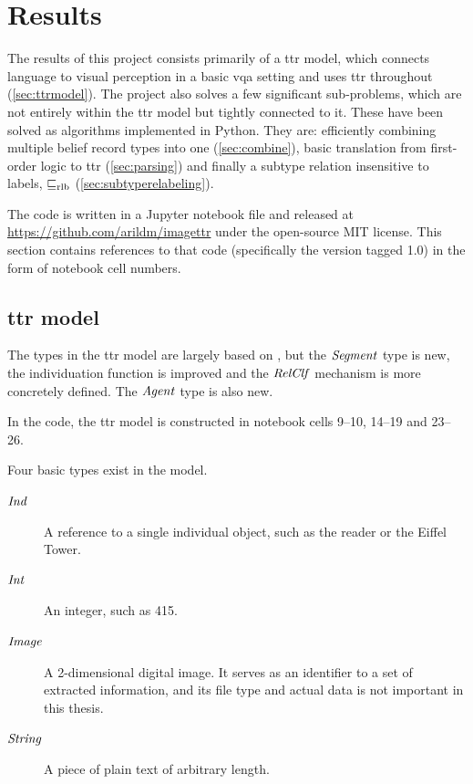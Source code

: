 \renewcommand{\sectionautorefname}{Section}
\let\subsectionautorefname\sectionautorefname
\let\subsubsectionautorefname\sectionautorefname
\section{Results}
\label{sec:results}

The results of this project consists primarily of a \gls{ttr} model, which connects language to visual perception in a basic \gls{vqa} setting and uses \gls{ttr} throughout (\autoref{sec:ttrmodel}).
The project also solves a few significant sub-problems, which are not entirely within the \gls{ttr} model but tightly connected to it.
These have been solved as algorithms implemented in Python.
They are: efficiently combining multiple belief record types into one (\autoref{sec:combine}), basic translation from first-order logic to \gls{ttr} (\autoref{sec:parsing}) and finally a subtype relation insensitive to labels, $\mathrel{\sqsubseteq_\text{rlb}}$ (\autoref{sec:subtyperelabeling}).

The code is written in a Jupyter notebook file and released at \url{https://github.com/arildm/imagettr} under the open-source MIT license.
This section contains references to that code (specifically the version tagged 1.0) in the form of notebook cell numbers.



\subsection{\Gls{ttr} model}
\label{sec:ttrmodel}

The types in the \gls{ttr} model are largely based on \cite{lspc}, but the $\mathit{Segment}$ type is new, the individuation function is improved and the $\mathit{RelClf}$ mechanism is more concretely defined.
The $\mathit{Agent}$ type is also new.

In the code, the \gls{ttr} model is constructed in notebook cells 9–10, 14–19 and 23–26.

Four basic types exist in the model.

\begin{description}
\item [$\mathit{Ind}$] A reference to a single individual object, such as the reader or the Eiffel Tower.
\item [$\mathit{Int}$] An integer, such as 415.
\item [$\mathit{Image}$] A 2-dimensional digital image.
It serves as an identifier to a set of extracted information, and its file type and actual data is not important in this thesis.
\item [$\mathit{String}$] A piece of plain text of arbitrary length.
\end{description}

